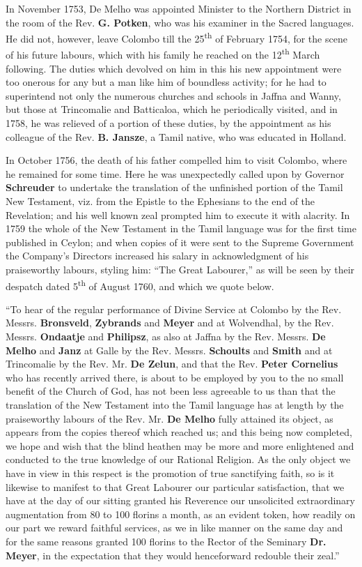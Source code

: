 \documentclass{article}
\begin{document}
In November 1753, De Melho was appointed Minister to the Northern District in the room of the Rev. \textbf{G. Potken}, who was his examiner in the Sacred languages. He did not, however, leave Colombo till the 25\textsuperscript{th} of February 1754, for the scene of his future labours, which with his family he reached on the 12\textsuperscript{th} March following. The duties which devolved on him in this his new appointment were too onerous for any but a man like him of boundless activity; for he had to superintend not only the numerous churches and schools in Jaffna and Wanny, but those at Trincomalie and Batticaloa, which he periodically visited, and in 1758, he was relieved of a portion of these duties, by the appointment as his colleague of the Rev. \textbf{B. Jansze}, a Tamil native, who was educated in Holland.

In October 1756, the death of his father compelled him to visit Colombo, where he remained for some time. Here he was unexpectedly called upon by Governor \textbf{Schreuder} to undertake the translation of the unfinished portion of the Tamil New Testament, viz. from the Epistle to the Ephesians to the end of the Revelation; and his well known zeal prompted him to execute it with alacrity. In 1759 the whole of the New Testament in the Tamil language was for the first time published in Ceylon; and when copies of it were sent to the Supreme Government the Company's Directors increased his salary in acknowledgment of his praiseworthy labours, styling him: ``The Great Labourer,'' as will be seen by their despatch dated 5\textsuperscript{th} of August 1760, and which we quote below.

``To hear of the regular performance of Divine Service at Colombo by the Rev. Messrs. \textbf{Bronsveld}, \textbf{Zybrands} and \textbf{Meyer} and at Wolvendhal, by the Rev. Messrs. \textbf{Ondaatje} and \textbf{Philipsz}, as also at Jaffna by the Rev. Messrs. \textbf{De Melho} and \textbf{Janz} at Galle by the Rev. Messrs. \textbf{Schoults} and \textbf{Smith} and at Trincomalie by the Rev. Mr. \textbf{De Zelun}, and that the Rev. \textbf{Peter Cornelius} who has recently arrived there, is about to be employed by you to the no small benefit of the Church of God, has not been less agreeable to us than that the translation of the New Testament into the Tamil language has at length by the praiseworthy labours of the Rev. Mr. \textbf{De Melho} fully attained its object, as appears from the copies thereof which reached us; and this being now completed, we hope and wish that the blind heathen may be more and more enlightened and conducted to the true knowledge of our Rational Religion. As the only object we have in view in this respect is the promotion of true sanctifying faith, so is it likewise to manifest to that Great Labourer our particular satisfaction, that we have at the day of our sitting granted his Reverence our unsolicited extraordinary augmentation from 80 to 100 florins a month, as an evident token, how readily on our part we reward faithful services, as we in like manner on the same day and for the same reasons granted 100 florins to the Rector of the Seminary \textbf{Dr. Meyer}, in the expectation that they would henceforward redouble their zeal.''
\end{document}
